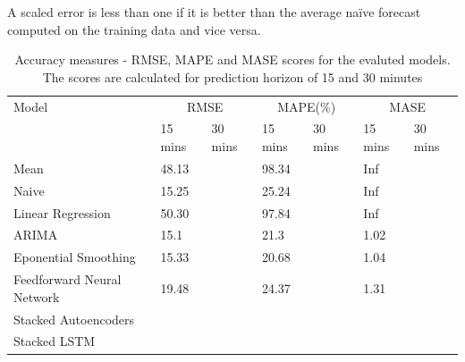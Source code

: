 A scaled error is less than one if it is better than the average naïve forecast computed on the
training data and vice versa.








\begin{table}
\centering
    \begin{tabular}{| l | l | l| l | l | l | l|} \hline
        Model & \multicolumn{2}{|c|}{RMSE} & \multicolumn{2}{|c|}{MAPE(\%)} & \multicolumn{2}{|c|}{MASE} \\
        & 15 mins & 30 mins & 15 mins & 30 mins & 15 mins & 30 mins \\ \hline
        Mean & 48.13 &  & 98.34 &  & Inf &  \\
        Naive & 15.25 &  & 25.24 &  & Inf &  \\
        Linear Regression & 50.30 &  & 97.84 &  & Inf &  \\
        ARIMA & 15.1 &  & 21.3 &   & 1.02 &  \\
        Eponential Smoothing & 15.33 &   & 20.68 &  & 1.04 &  \\
        Feedforward Neural Network & 19.48 &  & 24.37 &  & 1.31 &  \\
        Stacked Autoencoders &  &  &  &  &  &  \\
        Stacked LSTM &  &  &  &  &  &  \\ \hline
    \end{tabular}
    \caption[Model comparisons]{Accuracy measures - RMSE, MAPE and MASE scores for the evaluted
    models. The scores are calculated for prediction horizon of 15 and 30 minutes}
    \label{table:accuracyScores}
\end{table}